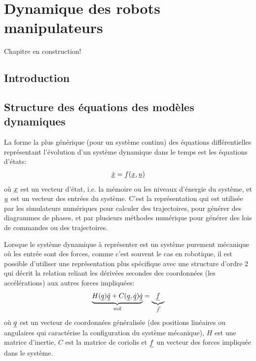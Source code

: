 \chapter{Dynamique des robots manipulateurs}
\label{sec:dynamic}

Chapitre en construction!

\section{Introduction}


\section{Structure des équations des modèles dynamiques}
La forme la plus générique (pour un système continu) des équations différentielles représentant l'évolution d'un système dynamique dans le temps est les équations d'états:
%
\begin{align}
\dot{\underline{x}} = f( \underline{x}, \underline{u})
\end{align}
%
où $\underline{x}$ est un vecteur d'état, i.e. la mémoire ou les niveaux d'énergie du système, et $\underline{u}$ est un vecteur des entrées du système. C'est la représentation qui est utilisée par les simulateurs numériques pour calculer des trajectoires, pour générer des diagrammes de phases, et par plusieurs méthodes numérique pour générer des lois de commandes ou des trajectoires. 

Lorsque le système dynamique à représenter est un système purement mécanique où les entrée sont des forces, comme c'est souvent le cas en robotique, il est possible d'utiliser une représentation plus spécifique avec une structure d'ordre 2 qui décrit la relation reliant les dérivées secondes des coordonnées (les accélérations) aux autres forces impliquées:
%
\begin{align}
\underbrace{
H(\underline{q}) \underline{\ddot{q}} + C(\underline{q},\underline{\dot{q}}) \underline{\dot{q}} 
}_{ m \Vec{a}}
=  
\underbrace{
\underline{f} 
}_{\Vec{f}}
\label{eq:mecdyn}
\end{align}
%
où $\underline{q}$ est un vecteur de coordonnées généralisée (des positions linéaires ou angulaires qui caractérise la configuration du système mécanique), $H$ est une matrice d'inertie, $C$ est la matrice de coriolis et $\underline{f}$ un vecteur des forces impliquée dans le système.

